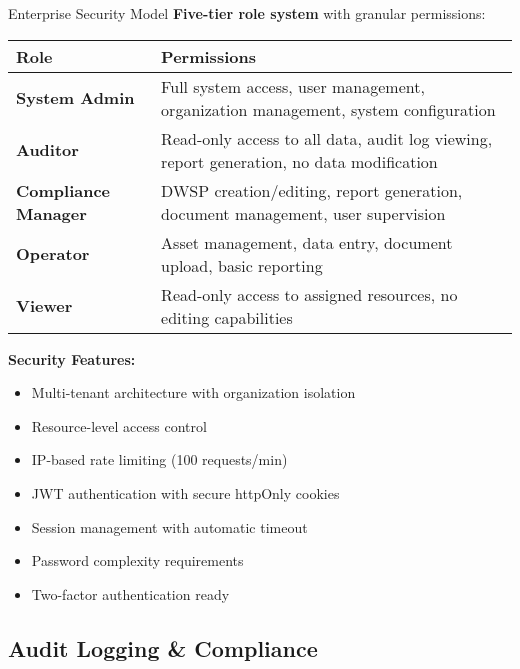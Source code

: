 \documentclass[11pt,a4paper]{article}
\begin{document}
\begin{featurebox}{Enterprise Security Model}
    \textbf{Five-tier role system} with granular permissions:

    \vspace{0.5cm}
    \begin{table}[H]
    \centering
    \begin{tabular}{p{3.5cm}p{10cm}}
    \toprule
    \textbf{Role} & \textbf{Permissions} \\
    \midrule
    \textbf{System Admin} & Full system access, user management, organization management, system configuration \\[0.3cm]
    \textbf{Auditor} & Read-only access to all data, audit log viewing, report generation, no data modification \\[0.3cm]
    \textbf{Compliance Manager} & DWSP creation/editing, report generation, document management, user supervision \\[0.3cm]
    \textbf{Operator} & Asset management, data entry, document upload, basic reporting \\[0.3cm]
    \textbf{Viewer} & Read-only access to assigned resources, no editing capabilities \\
    \bottomrule
    \end{tabular}
    \end{table}

    \vspace{0.5cm}
    \textbf{Security Features:}
    \begin{itemize}[itemsep=0.2em]
        \item Multi-tenant architecture with organization isolation
        \item Resource-level access control
        \item IP-based rate limiting (100 requests/min)
        \item JWT authentication with secure httpOnly cookies
        \item Session management with automatic timeout
        \item Password complexity requirements
        \item Two-factor authentication ready
    \end{itemize}
\end{featurebox}

\subsection{Audit Logging \& Compliance}
\end{document}
